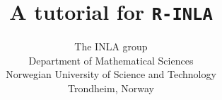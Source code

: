 \documentclass[a4paper, twoside, openright, chapterprefix, 11pt]{scrreprt}
\newcommand{\tv}{\texttt}
\begin{document}
\title{A tutorial for \tv{R-INLA}}
\author{The INLA group\\
 Department of Mathematical Sciences\\
 Norwegian University of Science and Technology\\
 Trondheim, Norway}
\maketitle
{} 



\tableofcontents

\pagestyle{headings}















\appendix
 


\end{document}
